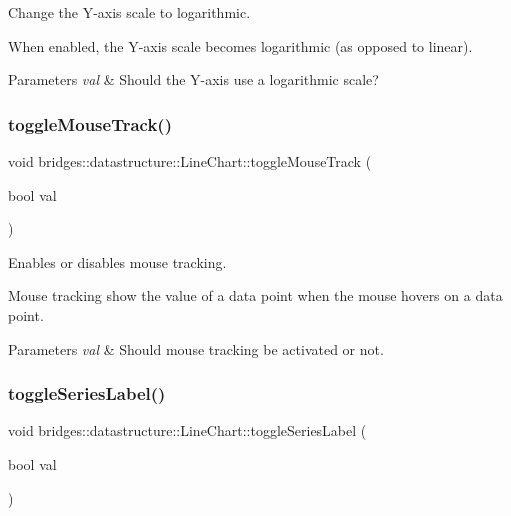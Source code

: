 Change the Y-\/axis scale to logarithmic. 

When enabled, the Y-\/axis scale becomes logarithmic (as opposed to linear).


\begin{DoxyParams}{Parameters}
{\em val} & Should the Y-\/axis use a logarithmic scale? \\
\hline
\end{DoxyParams}
\mbox{\label{classbridges_1_1datastructure_1_1_line_chart_aece56ea5afaf10037b698673801c4496}} 
\subsubsection{\texorpdfstring{toggle\+Mouse\+Track()}{toggleMouseTrack()}}
{\footnotesize\ttfamily void bridges\+::datastructure\+::\+Line\+Chart\+::toggle\+Mouse\+Track (\begin{DoxyParamCaption}\item[{bool}]{val }\end{DoxyParamCaption})\hspace{0.3cm}{\ttfamily [inline]}}



Enables or disables mouse tracking. 

Mouse tracking show the value of a data point when the mouse hovers on a data point.


\begin{DoxyParams}{Parameters}
{\em val} & Should mouse tracking be activated or not. \\
\hline
\end{DoxyParams}
\mbox{\label{classbridges_1_1datastructure_1_1_line_chart_a21031cd026426ab91307626ce9651c03}} 
\subsubsection{\texorpdfstring{toggle\+Series\+Label()}{toggleSeriesLabel()}}
{\footnotesize\ttfamily void bridges\+::datastructure\+::\+Line\+Chart\+::toggle\+Series\+Label (\begin{DoxyParamCaption}\item[{bool}]{val }\end{DoxyParamCaption})\hspace{0.3cm}{\ttfamily [inline]}}



